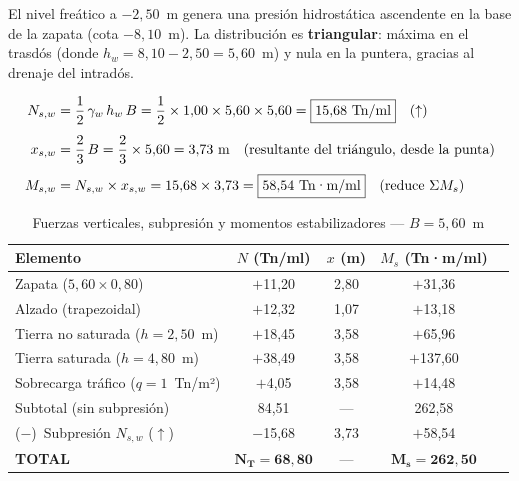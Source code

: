 El nivel freático a $-2{,}50$~m genera una presión hidrostática ascendente en
la base de la zapata (cota $-8{,}10$~m). La distribución es \textbf{triangular}:
máxima en el trasdós (donde $h_w = 8{,}10 - 2{,}50 = 5{,}60$~m) y nula en la
puntera, gracias al drenaje del intradós.

\begin{align*}
  N_{s,w} &= \frac{1}{2}\,\gamma_w\,h_w\,B
            = \frac{1}{2} \times 1{,}00 \times 5{,}60 \times 5{,}60
            = \boxed{15{,}68~\text{Tn/ml}} \quad (\uparrow) \\[4pt]
  x_{s,w} &= \frac{2}{3}\,B = \frac{2}{3} \times 5{,}60 = 3{,}73~\text{m}
            \quad \text{(resultante del triángulo, desde la punta)} \\[4pt]
  M_{s,w} &= N_{s,w} \times x_{s,w} = 15{,}68 \times 3{,}73
            = \boxed{58{,}54~\text{Tn·m/ml}} \quad (\text{reduce}~\Sigma M_s)
\end{align*}

\begin{table}[H]
  \centering
  \caption{Fuerzas verticales, subpresión y momentos estabilizadores — $B = 5{,}60$~m}
  \label{tab:fuerzas_verticales_5m}
  \begin{tabular}{@{}lcccc@{}}
    \toprule
    \textbf{Elemento} & $N$ \textbf{(Tn/ml)} & $x$ \textbf{(m)} & $M_s$ \textbf{(Tn·m/ml)} \\
    \midrule
    Zapata ($5{,}60 \times 0{,}80$)       & $+$11{,}20 & 2{,}80 & $+$31{,}36 \\
    Alzado (trapezoidal)                   & $+$12{,}32 & 1{,}07 & $+$13{,}18 \\
    Tierra no saturada ($h=2{,}50$~m)     & $+$18{,}45 & 3{,}58 & $+$65{,}96 \\
    Tierra saturada ($h=4{,}80$~m)        & $+$38{,}49 & 3{,}58 & $+$137{,}60 \\
    Sobrecarga tráfico ($q=1$~Tn/m²)      & $+$4{,}05  & 3{,}58 & $+$14{,}48 \\
    \midrule
    Subtotal (sin subpresión)              & 84{,}51    & —      & 262{,}58 \\
    \midrule
    ($-$)~Subpresión $N_{s,w}$ ($\uparrow$) & $-$15{,}68 & 3{,}73 & $+$58{,}54 \\
    \midrule
    \textbf{TOTAL} & $\mathbf{N_T = 68{,}80}$ & — & $\mathbf{M_s = 262{,}50}$ \\
    \bottomrule
  \end{tabular}
\end{table}

